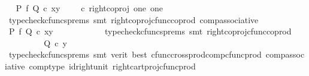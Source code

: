 \begin{isabellebody}
\ \isamarkupfalse%
\ {\isachardoublequoteopen}{\isacharparenleft}{\kern0pt}P\ {\isasymtimes}\isactrlsub f\ Q{\isacharparenright}{\kern0pt}\ {\isasymcirc}\isactrlsub c\ {\isasymlangle}x{\isacharcomma}{\kern0pt}y{\isasymrangle}\ {\isacharequal}{\kern0pt}\ {\isacharparenleft}{\kern0pt}{\isasymlangle}{\isasymf}{\isacharcomma}{\kern0pt}{\isasymf}{\isasymrangle}\ {\isasymamalg}\ {\isasymlangle}{\isasymf}{\isacharcomma}{\kern0pt}{\isasymt}{\isasymrangle}{\isacharparenright}{\kern0pt}\ {\isasymcirc}\isactrlsub c\ right{\isacharunderscore}{\kern0pt}coproj\ one\ one{\isachardoublequoteclose}\isanewline
\ \ \ \ \ \ \ \ \isamarkupfalse%
\ {\isacharparenleft}{\kern0pt}typecheck{\isacharunderscore}{\kern0pt}cfuncs{\isacharunderscore}{\kern0pt}prems{\isacharcomma}{\kern0pt}\ smt\ right{\isacharunderscore}{\kern0pt}coproj{\isacharunderscore}{\kern0pt}cfunc{\isacharunderscore}{\kern0pt}coprod\ comp{\isacharunderscore}{\kern0pt}associative{}{\isacharparenright}{\kern0pt}\isanewline
\ \ \ \ \ \ \isamarkupfalse%
\ \isamarkupfalse%
\ {\isachardoublequoteopen}{\isacharparenleft}{\kern0pt}P\ {\isasymtimes}\isactrlsub f\ Q{\isacharparenright}{\kern0pt}\ {\isasymcirc}\isactrlsub c\ {\isasymlangle}x{\isacharcomma}{\kern0pt}y{\isasymrangle}\ {\isacharequal}{\kern0pt}\ {\isasymlangle}{\isasymf}{\isacharcomma}{\kern0pt}{\isasymt}{\isasymrangle}{\isachardoublequoteclose}\isanewline
\ \ \ \ \ \ \ \ \isamarkupfalse%
\ {\isacharparenleft}{\kern0pt}typecheck{\isacharunderscore}{\kern0pt}cfuncs{\isacharunderscore}{\kern0pt}prems{\isacharcomma}{\kern0pt}\ smt\ right{\isacharunderscore}{\kern0pt}coproj{\isacharunderscore}{\kern0pt}cfunc{\isacharunderscore}{\kern0pt}coprod{\isacharparenright}{\kern0pt}\isanewline
\ \ \ \ \ \ \isamarkupfalse%
\ \isamarkupfalse%
\ {\isachardoublequoteopen}Q\ {\isasymcirc}\isactrlsub c\ y\ {\isacharequal}{\kern0pt}\ {\isasymt}{\isachardoublequoteclose}\isanewline
\ \ \ \ \ \ \ \ \isamarkupfalse%
\ {\isacharparenleft}{\kern0pt}typecheck{\isacharunderscore}{\kern0pt}cfuncs{\isacharunderscore}{\kern0pt}prems{\isacharcomma}{\kern0pt}\ smt\ {\isacharparenleft}{\kern0pt}verit{\isacharcomma}{\kern0pt}\ best{\isacharparenright}{\kern0pt}\ cfunc{\isacharunderscore}{\kern0pt}cross{\isacharunderscore}{\kern0pt}prod{\isacharunderscore}{\kern0pt}comp{\isacharunderscore}{\kern0pt}cfunc{\isacharunderscore}{\kern0pt}prod\ comp{\isacharunderscore}{\kern0pt}associative{}\ comp{\isacharunderscore}{\kern0pt}type\ id{\isacharunderscore}{\kern0pt}right{\isacharunderscore}{\kern0pt}unit{}\ right{\isacharunderscore}{\kern0pt}cart{\isacharunderscore}{\kern0pt}proj{\isacharunderscore}{\kern0pt}cfunc{\isacharunderscore}{\kern0pt}prod{\isacharparenright}{\kern0pt}\isanewline

\end{isabellebody}
